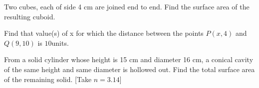     \item Two cubes, each of side 4 cm are joined end to end. Find the surface area of the resulting cuboid.
    \item Find that value(s) of x for which the distance between the points $P(x,4)$ and $Q(9,10)$ is $10$units.
    \item From a solid cylinder whose height is 15 cm and diameter 16 cm, a conical cavity of the same height and same diameter is hollowed out. Find the total surface area of the remaining solid. [Take $n=3.14$]

